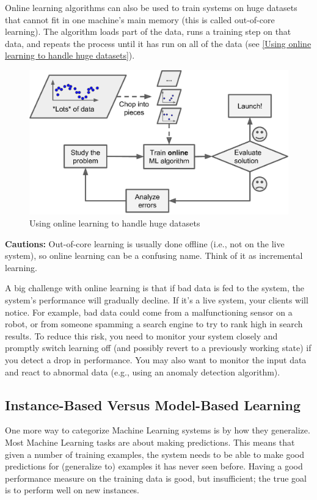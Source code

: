 Online learning algorithms can also be used to train systems on huge datasets that
cannot fit in one machine’s main memory (this is called out-of-core learning). The
algorithm loads part of the data, runs a training step on that data, and repeats the
process until it has run on all of the data (see \autoref{Using online learning to handle huge datasets}).
\begin{figure}
\centering
\includegraphics{img/Using online learning to handle huge datasets.png}
\caption{Using online learning to handle huge datasets}
\label{Using online learning to handle huge datasets}
\end{figure}

\textbf{Cautions:} Out-of-core learning is usually done offline (i.e., not on the live
system), so online learning can be a confusing name. Think of it as
incremental learning.

A big challenge with online learning is that if bad data is fed to the system, the system’s performance will gradually decline. If it’s a live system, your clients will notice.
For example, bad data could come from a malfunctioning sensor on a robot, or from
someone spamming a search engine to try to rank high in search results. To reduce
this risk, you need to monitor your system closely and promptly switch learning off
(and possibly revert to a previously working state) if you detect a drop in performance. You may also want to monitor the input data and react to abnormal data (e.g.,
using an anomaly detection algorithm).
\subsection{Instance-Based Versus Model-Based Learning}
One more way to categorize Machine Learning systems is by how they generalize.
Most Machine Learning tasks are about making predictions. This means that given a
number of training examples, the system needs to be able to make good predictions
for (generalize to) examples it has never seen before. Having a good performance
measure on the training data is good, but insufficient; the true goal is to perform well
on new instances.

